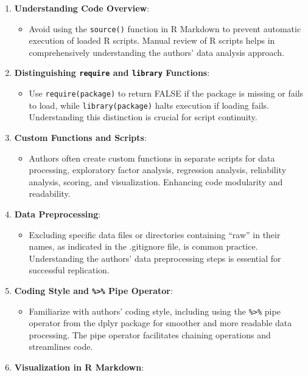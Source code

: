 \documentclass[
  man]{apa6}
\providecommand{\tightlist}{%
  \setlength{\itemsep}{0pt}\setlength{\parskip}{0pt}}
\begin{document}
\begin{enumerate}
\def\labelenumi{\arabic{enumi}.}
\tightlist
\item
  \textbf{Understanding Code Overview}:

  \begin{itemize}
  \tightlist
  \item
    Avoid using the \texttt{source()} function in R Markdown to prevent automatic execution of loaded R scripts. Manual review of R scripts helps in comprehensively understanding the authors' data analysis approach.
  \end{itemize}
\item
  \textbf{Distinguishing \texttt{require} and \texttt{library} Functions}:

  \begin{itemize}
  \tightlist
  \item
    Use \texttt{require(package)} to return FALSE if the package is missing or fails to load, while \texttt{library(package)} halts execution if loading fails. Understanding this distinction is crucial for script continuity.
  \end{itemize}
\item
  \textbf{Custom Functions and Scripts}:

  \begin{itemize}
  \tightlist
  \item
    Authors often create custom functions in separate scripts for data processing, exploratory factor analysis, regression analysis, reliability analysis, scoring, and visualization. Enhancing code modularity and readability.
  \end{itemize}
\item
  \textbf{Data Preprocessing}:

  \begin{itemize}
  \tightlist
  \item
    Excluding specific data files or directories containing ``raw'' in their names, as indicated in the .gitignore file, is common practice. Understanding the authors' data preprocessing steps is essential for successful replication.
  \end{itemize}
\item
  \textbf{Coding Style and \texttt{\%\textgreater{}\%} Pipe Operator}:

  \begin{itemize}
  \tightlist
  \item
    Familiarize with authors' coding style, including using the \texttt{\%\textgreater{}\%} pipe operator from the dplyr package for smoother and more readable data processing. The pipe operator facilitates chaining operations and streamlines code.
  \end{itemize}
\item
  \textbf{Visualization in R Markdown}:


\end{enumerate}
\end{document}
